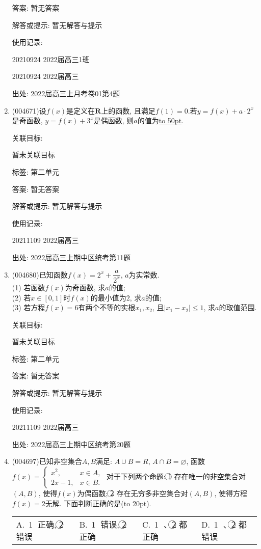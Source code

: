 \documentclass[10pt,a4paper]{article}
\newcommand{\blank}[1]{\underline{\hbox to #1pt{}}}
\newcommand{\bracket}[1]{(\hbox to #1pt{})}
\newcommand{\fourch}[4]{\par\begin{tabular}{p{.23\textwidth}p{.23\textwidth}p{.23\textwidth}p{.23\textwidth}}
A.~#1 &B.~#2& C.~#3& D.~#4
\end{tabular}}
\begin{document}
\begin{enumerate}[1.]
答案: 暂无答案

解答或提示: 暂无解答与提示

使用记录:

20210924	2022届高三1班	

20210924	2022届高三	


出处: 2022届高三上月考卷01第4题
\item { (004671)}设$f(x)$是定义在$\mathbf{R}$上的函数, 且满足$f(1)=0$.若$y=f(x)+a\cdot 2^x$是奇函数, $y=f(x)+3^x$是偶函数, 则$a$的值为\blank{50}.


关联目标:

暂未关联目标



标签: 第二单元

答案: 暂无答案

解答或提示: 暂无解答与提示

使用记录:

20211109	2022届高三	


出处: 2022届高三上期中区统考第11题
\item { (004680)}已知函数$f(x)=2^x+\dfrac a{2^x}$, $a$为实常数.\\
(1) 若函数$f(x)$为奇函数, 求$a$的值;\\
(2) 若$x\in [0,1]$时$f(x)$的最小值为$2$, 求$a$的值;\\
(3) 若方程$f(x)=6$有两个不等的实根$x_1,x_2$, 且$|x_1-x_2|\le 1$, 求$a$的取值范围.


关联目标:

暂未关联目标



标签: 第二单元

答案: 暂无答案

解答或提示: 暂无解答与提示

使用记录:

20211109	2022届高三			


出处: 2022届高三上期中区统考第20题
\item { (004697)}已知非空集合$A,B$满足: $A\cup B=R$, $A\cap B=\varnothing$, 函数$f(x)=\begin{cases}
x^2, &  x\in A,  \\ 2x-1, &  x\in B.  \end{cases}$ 对于下列两个命题: \textcircled{1} 存在唯一的非空集合对$(A,B)$, 使得$f(x)$为偶函数; \textcircled{2} 存在无穷多非空集合对$(A,B)$, 使得方程$f(x)=2$无解. 下面判断正确的是\bracket{20}.
\fourch{\textcircled{1} 正确, \textcircled{2} 错误}{\textcircled{1} 错误, \textcircled{2} 正确}{\textcircled{1} 、\textcircled{2} 都正确}{\textcircled{1} 、\textcircled{2} 都错误}



\end{enumerate}
\end{document}
